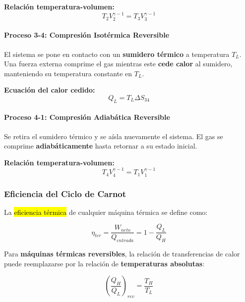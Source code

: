 \documentclass{article}
\begin{document}
    \textbf{Relación temperatura-volumen:}
    \begin{equation}
    T_2 V_2^{\gamma-1} = T_3 V_3^{\gamma-1}
    \end{equation}

    \paragraph{Proceso 3-4: Compresión Isotérmica Reversible}
    El sistema se pone en contacto con un \textbf{sumidero térmico} a temperatura $T_L$. Una fuerza externa comprime el gas mientras este \textbf{cede calor} al sumidero, manteniendo su temperatura constante en $T_L$.

    \textbf{Ecuación del calor cedido:}
    \begin{equation}
    Q_L = T_L \Delta S_{34}
    \end{equation}

    \paragraph{Proceso 4-1: Compresión Adiabática Reversible}
    Se retira el sumidero térmico y se aísla nuevamente el sistema. El gas se comprime \textbf{adiabáticamente} hasta retornar a su estado inicial.

    \textbf{Relación temperatura-volumen:}
    \begin{equation}
    T_4 V_4^{\gamma-1} = T_1 V_1^{\gamma-1}
    \end{equation}

    \subsubsection{Eficiencia del Ciclo de Carnot}

    La \hl{eficiencia térmica} de cualquier máquina térmica se define como:

    \begin{equation}
    \eta_{ter} = \frac{W_{neto}}{Q_{entrada}} = 1 - \frac{Q_L}{Q_H}
    \end{equation}

    Para \textbf{máquinas térmicas reversibles}, la relación de transferencias de calor puede reemplazarse por la relación de \textbf{temperaturas absolutas}:

    \begin{equation}
    \left(\frac{Q_H}{Q_L}\right)_{rev} = \frac{T_H}{T_L}
    \end{equation}
\end{document}
